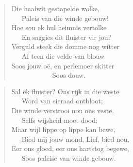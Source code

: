 \begin{verse}
Die haalwit gestapelde wolke, \\ 
\ \ \ Paleis van die winde gebouw! \\ 
Hoe sou ek hul heimnis vertolke \\ 
\ \ \ En saggies dit fluister vir jou? \\ 
Verguld steek die domme nog witter \\ 
\ \ \ Af teen die velde van blouw \\ 
Soos jouw oë, en perlemoer skitter \\ 
\ \ \ \ \ \ \ \ \ \ \ \ Soos douw. \\ 
\end{verse}

\begin{verse}
Sal ek fluister? Ons rijk in die weste \\ 
\ \ \ Word van sieraad ontbloot; \\ 
Die winde verstrooi nou ons veste, \\ 
\ \ \ Selfs wijsheid moet dood; \\ 
Maar wijl lippe op lippe kan bewe, \\ 
\ \ \ Bied mij jouw mond, Lief, bied nou, \\ 
Eer ons gloed, eer ons hartstog begewe, \\ 
\ \ \ Soos paleise van winde gebouw. \\ 
\end{verse}